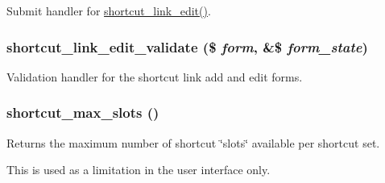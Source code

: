 Submit handler for \hyperlink{group__forms_gab5cd373d268cb28d52f75cd0309da63c}{shortcut\_\-link\_\-edit()}. \hypertarget{shortcut_8admin_8inc_a91ed3ef518afe23ce152c277dc7b99cc}{
\subsubsection[{shortcut\_\-link\_\-edit\_\-validate}]{\setlength{\rightskip}{0pt plus 5cm}shortcut\_\-link\_\-edit\_\-validate (\$ {\em form}, \/  \&\$ {\em form\_\-state})}}
\label{shortcut_8admin_8inc_a91ed3ef518afe23ce152c277dc7b99cc}
Validation handler for the shortcut link add and edit forms. \hypertarget{shortcut_8admin_8inc_a4bb1c6aac5c6c40537b3add69ccd543d}{
\subsubsection[{shortcut\_\-max\_\-slots}]{\setlength{\rightskip}{0pt plus 5cm}shortcut\_\-max\_\-slots ()}}
\label{shortcut_8admin_8inc_a4bb1c6aac5c6c40537b3add69ccd543d}
Returns the maximum number of shortcut \char`\"{}slots\char`\"{} available per shortcut set.

This is used as a limitation in the user interface only.

